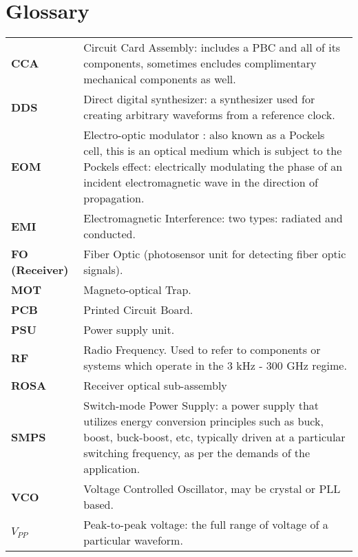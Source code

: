 \newpage
\section*{Glossary}

\begin{tabularx}{\linewidth}{lX}
  {\bf CCA} & Circuit Card Assembly: includes a PBC and all of its components,
  sometimes encludes complimentary mechanical components as well. \\
  {\bf DDS} & Direct digital synthesizer: a synthesizer used for creating
  arbitrary waveforms from a reference clock. \\
  {\bf EOM} & Electro-optic modulator : also known as a Pockels cell, this
  is an optical medium which is subject to the Pockels effect: electrically
  modulating the phase of an incident electromagnetic wave in the direction
  of propagation.\\
  {\bf EMI} & Electromagnetic Interference: two types: radiated and conducted.\\
  {\bf FO (Receiver)} & Fiber Optic (photosensor unit for detecting fiber optic
  signals).  \\
  {\bf MOT} & Magneto-optical Trap. \\
  {\bf PCB} & Printed Circuit Board. \\
  {\bf PSU} & Power supply unit. \\
  {\bf RF} & Radio Frequency. Used to refer to components or systems which
  operate in the 3 kHz - 300 GHz regime. \\
  {\bf ROSA} & Receiver optical sub-assembly \\
  {\bf SMPS} & Switch-mode Power Supply: a power supply that utilizes
  energy conversion principles such as buck, boost, buck-boost, etc, typically
  driven at a particular switching frequency, as per the demands of the
  application. \\
  {\bf VCO} & Voltage Controlled Oscillator, may be crystal or PLL based. \\
  {\bf $V_{PP}$} & Peak-to-peak voltage: the full range of voltage of a
  particular waveform.
\end{tabularx}